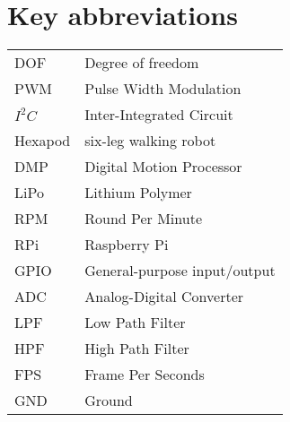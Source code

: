 



\pagestyle{empty}


\maketitle 						%

\frontmatter %
\pagestyle{fancy}



\tableofcontents
\listoffigures
\listoftables
\listofalgorithms


\chapter*{Key abbreviations}

\begin{tabular}{l    l }
    DOF & Degree of freedom  \\  
    PWM &  Pulse Width Modulation  \\   
    $I^2C$  & Inter-Integrated Circuit   \\  
    Hexapod &  six-leg walking robot \\  
    DMP & Digital Motion Processor \\  
    LiPo &   Lithium Polymer\\ 
    RPM   & Round Per Minute  \\
    RPi &   Raspberry Pi\\  
    GPIO &  General-purpose input/output \\  
    ADC   & Analog-Digital Converter   \\  
    LPF & Low Path Filter \\
    HPF &  High Path Filter \\
    FPS & Frame Per Seconds\\
    GND & Ground
\end{tabular} 



